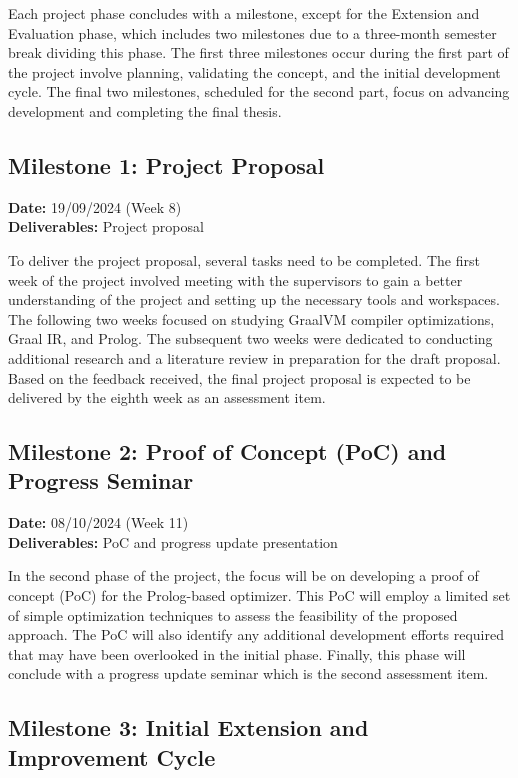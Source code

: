 \newpage
Each project phase concludes with a milestone, except for the Extension and Evaluation phase, which includes two milestones due to a three-month semester break dividing this phase. The first three milestones occur during the first part of the project involve planning, validating the concept, and the initial development cycle. The final two milestones, scheduled for the second part, focus on advancing development and completing the final thesis.

\subsection{Milestone 1: Project Proposal}
\textbf{Date:} 19/09/2024 (Week 8) \\
\textbf{Deliverables:} Project proposal

To deliver the project proposal, several tasks need to be completed. The first week of the project involved meeting with the supervisors to gain a better understanding of the project and setting up the necessary tools and workspaces. The following two weeks focused on studying GraalVM compiler optimizations, Graal IR, and Prolog. The subsequent two weeks were dedicated to conducting additional research and a literature review in preparation for the draft proposal. Based on the feedback received, the final project proposal is expected to be delivered by the eighth week as an assessment item.

\subsection{Milestone 2: Proof of Concept (PoC) and Progress Seminar}

\textbf{Date:} 08/10/2024 (Week 11) \\
\textbf{Deliverables:} PoC and progress update presentation

In the second phase of the project, the focus will be on developing a proof of concept (PoC) for the Prolog-based optimizer. This PoC will employ a limited set of simple optimization techniques to assess the feasibility of the proposed approach. The PoC will also identify any additional development efforts required that may have been overlooked in the initial phase. Finally, this phase will conclude with a progress update seminar which is the second assessment item.

\subsection{Milestone 3: Initial Extension and Improvement Cycle}

